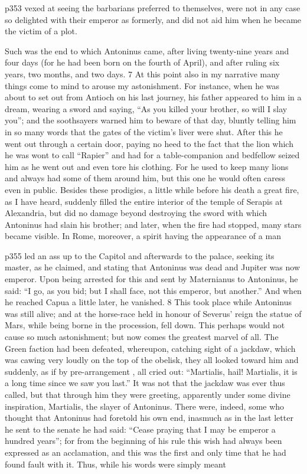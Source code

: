 p353 vexed at seeing the barbarians preferred to themselves, were not in any case so delighted with their emperor as formerly, and did not aid him when he became the victim of a plot.

Such was the end to which Antoninus came, after living twenty-nine years and four days (for he had been born on the fourth of April), and after ruling six years, two months, and two days. 7
At this point also in my narrative many things come to mind to arouse my astonishment. For instance, when he was about to set out from Antioch on his last journey, his father appeared to him in a dream, wearing a sword and saying, ``As you killed your brother, so will I slay you''; and the soothsayers warned him to beware of that day, bluntly telling him in so many words that the gates of the victim's liver were shut. After this he went out through a certain door, paying no heed to the fact that the lion which he was wont to call ``Rapier'' and had for a table-companion and bedfellow seized him as he went out and even tore his clothing. For he used to keep many lions and always had some of them around him, but this one he would often caress even in public. Besides these prodigies, a little while before his death a great fire, as I have heard, suddenly filled the entire interior of the temple of Serapis at Alexandria, but did no damage beyond destroying the sword with which Antoninus had slain his brother; and later, when the fire had stopped, many stars became visible. In Rome, moreover, a spirit having the appearance of a man

p355 led an ass up to the Capitol and afterwards to the palace, seeking its master, as he claimed, and stating that Antoninus was dead and Jupiter was now emperor. Upon being arrested for this and sent by Maternianus to Antoninus, he said: ``I go, as you bid; but I shall face, not this emperor, but another.'' And when he reached Capua a little later, he vanished. 8
This took place while Antoninus was still alive; and at the horse-race held in honour of Severus' reign the statue of Mars, while being borne in the procession, fell down. This perhaps would not cause so much astonishment; but now comes the greatest marvel of all. The Green faction had been defeated, whereupon, catching sight of a jackdaw, which was cawing very loudly on the top of the obelisk, they all looked toward him and suddenly, as if by pre-arrangement , all cried out: ``Martialis, hail! Martialis, it is a long time since we saw you last.'' It was not that the jackdaw was ever thus called, but that through him they were greeting, apparently under some divine inspiration, Martialis, the slayer of Antoninus. There were, indeed, some who thought that Antoninus had foretold his own end, inasmuch as in the last letter he sent to the senate he had said: ``Cease praying that I may be emperor a hundred years''; for from the beginning of his rule this wish had always been expressed as an acclamation, and this was the first and only time that he had found fault with it. Thus, while his words were simply meant

